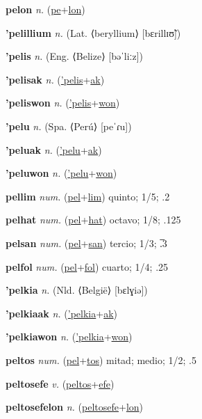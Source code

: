 \textbf{\hypertarget{pelon}{pelon}} \textit{n.} (\hyperlink{pe}{pe}+\allowbreak \hyperlink{lon}{lon})


\textbf{\hypertarget{'pelillium}{'pelillium}} \textit{n.} (Lat. ⟨beryllium⟩ [bɛrillɪʊ̃])


\textbf{\hypertarget{'pelis}{'pelis}} \textit{n.} (Eng. ⟨Belize⟩ [bəˈliːz])


\textbf{\hypertarget{'pelisak}{'pelisak}} \textit{n.} (\hyperlink{'pelis}{'pelis}+\allowbreak \hyperlink{ak}{ak})


\textbf{\hypertarget{'peliswon}{'peliswon}} \textit{n.} (\hyperlink{'pelis}{'pelis}+\allowbreak \hyperlink{won}{won})


\textbf{\hypertarget{'pelu}{'pelu}} \textit{n.} (Spa. ⟨Perú⟩ [peˈɾu])


\textbf{\hypertarget{'peluak}{'peluak}} \textit{n.} (\hyperlink{'pelu}{'pelu}+\allowbreak \hyperlink{ak}{ak})


\textbf{\hypertarget{'peluwon}{'peluwon}} \textit{n.} (\hyperlink{'pelu}{'pelu}+\allowbreak \hyperlink{won}{won})


\textbf{\hypertarget{pellim}{pellim}} \textit{num.} (\hyperlink{pel}{pel}+\allowbreak \hyperlink{lim}{lim})
quinto; 1/5; .2

\textbf{\hypertarget{pelhat}{pelhat}} \textit{num.} (\hyperlink{pel}{pel}+\allowbreak \hyperlink{hat}{hat})
octavo; 1/8; .125

\textbf{\hypertarget{pelsan}{pelsan}} \textit{num.} (\hyperlink{pel}{pel}+\allowbreak \hyperlink{san}{san})
tercio; 1/3; .̅3

\textbf{\hypertarget{pelfol}{pelfol}} \textit{num.} (\hyperlink{pel}{pel}+\allowbreak \hyperlink{fol}{fol})
cuarto; 1/4; .25

\textbf{\hypertarget{'pelkia}{'pelkia}} \textit{n.} (Nld. ⟨België⟩ [bɛlɣiə])


\textbf{\hypertarget{'pelkiaak}{'pelkiaak}} \textit{n.} (\hyperlink{'pelkia}{'pelkia}+\allowbreak \hyperlink{ak}{ak})


\textbf{\hypertarget{'pelkiawon}{'pelkiawon}} \textit{n.} (\hyperlink{'pelkia}{'pelkia}+\allowbreak \hyperlink{won}{won})


\textbf{\hypertarget{peltos}{peltos}} \textit{num.} (\hyperlink{pel}{pel}+\allowbreak \hyperlink{tos}{tos})
mitad; medio; 1/2; .5

\textbf{\hypertarget{peltosefe}{peltosefe}} \textit{v.} (\hyperlink{peltos}{peltos}+\allowbreak \hyperlink{efe}{efe})


\textbf{\hypertarget{peltosefelon}{peltosefelon}} \textit{n.} (\hyperlink{peltosefe}{peltosefe}+\allowbreak \hyperlink{lon}{lon})



